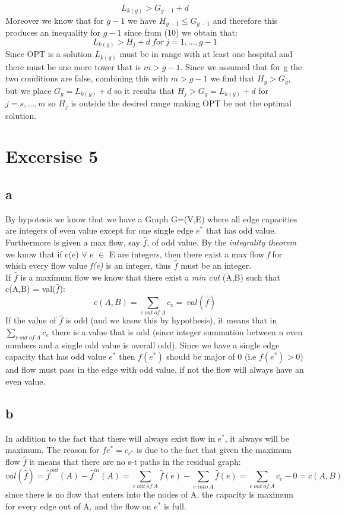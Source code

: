 \documentclass{article}
\begin{document}
\begin{equation}
L_{k(g)}>G_{g-1}+d
\end{equation} 
Moreover we know that for $g-1$ we have $H_{g-1}\le G_{g-1}$ and therefore this produces an inequality for $g-1$ since from (10) we obtain that:
\begin{equation}
L_{k(g)} > H_{j}+d\ for\ j=1,...,g-1 
\end{equation}
Since OPT is a solution $L_{k(g)}$ must be in range with at least one hospital and there must be one more tower that is $m>g-1$. Since we assumed that for g the two conditions are false, combining this with $m>g-1$ we find that $H_{g}>G_{g}$, but we place $G_{g}=L_{k(g)}+d$ so it results that $H_{j}>G_{g}=L_{k(g)}+d$ for $j=s,...,m$ so $H_{j}$ is outside the desired range making OPT be not the optimal solution.
\newpage
\section{Excersise 5}
\subsection{a}
By hypotesis we know that we have a Graph G=(V,E) where all edge capacities are integers of even value except for one single edge $e^{*}$ that has odd value. Furthermore is given a max flow, say $\hat{f}$, of odd value. By the \textit{integrality theorem} we know that if c(e) $\forall$ e $\in$ E are integers, then there exist a max flow \textit{f} for which every flow value \textit{f(e)} is an integer, thus $\hat{f}$ must be an integer.\\
If $\hat{f}$ is a maximum flow we know that there exist a \textit{min cut} (A,B) such that c(A,B) = val($\hat{f}$):
\begin{equation}
c(A,B)= \sum_{e\ out\ of\ A} c_e =\ val (\hat{f})
\end{equation}
If the value of $\hat{f}$ is odd (and we know this by hypothesis), it means that in $\sum_{e\ out\ of\ A} c_e$ there is a value that is odd (since integer summation between n even numbers and a single odd value is overall odd). Since we have a single edge capacity that has odd value $e^{*}$ then $f(e^{*})$ should be major of 0 (i.e $f(e^{*}) > 0 $) and flow must pass in the edge with odd value, if not the flow will always have an even value.
\subsection{b}
In addition to the fact that there will always exist flow in $e^{*}$, it always will be maximum. The reason for $fe^{*} = c_{e^{*}}$ is due to the fact that given the maximum flow $\hat{f}$ it means that there are no s-t paths in the residual graph:
\begin{equation}
val(\hat{f})=\hat{f}^{out}(A)-\hat{f}^{in}(A)=\sum_{e\ out\ of\ A}\hat{f}(e)-\sum_{e\ into\ A}\hat{f}(e)=\sum_{e\ out\ of\ A}c_{e}-0=c(A,B)
\end{equation}
since there is no flow that enters into the nodes of A, the capacity is maximum for every edge out of A, and the flow on $e^{*}$ is full.
\end{document}
